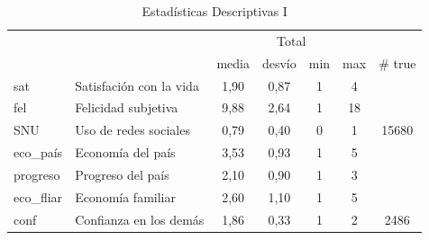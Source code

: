 \begin{table}[htbp]
  \centering
  \caption{Estadísticas Descriptivas I}
    \begin{tabular}{rlrrrrr}
          &       & \multicolumn{4}{c}{Total}     &  \\
          &       & \multicolumn{1}{c}{media} & \multicolumn{1}{c}{desvío} & \multicolumn{1}{c}{min} & \multicolumn{1}{c}{max} & \multicolumn{1}{c}{\# true} \\
    \midrule
    \multicolumn{1}{l}{sat} & Satisfación con la vida & \multicolumn{1}{c}{1,90} & \multicolumn{1}{c}{0,87} & \multicolumn{1}{c}{1} & \multicolumn{1}{c}{4} &  \\
    \multicolumn{1}{l}{fel} & Felicidad subjetiva & \multicolumn{1}{c}{9,88} & \multicolumn{1}{c}{2,64} & \multicolumn{1}{c}{1} & \multicolumn{1}{c}{18} &  \\
    \multicolumn{1}{l}{SNU} & Uso de redes sociales & \multicolumn{1}{c}{0,79} & \multicolumn{1}{c}{0,40} & \multicolumn{1}{c}{0} & \multicolumn{1}{c}{1} & \multicolumn{1}{c}{15680} \\
    \multicolumn{1}{l}{eco\_país} & Economía del país & \multicolumn{1}{c}{3,53} & \multicolumn{1}{c}{0,93} & \multicolumn{1}{c}{1} & \multicolumn{1}{c}{5} &  \\
    \multicolumn{1}{l}{progreso} & Progreso del país & \multicolumn{1}{c}{2,10} & \multicolumn{1}{c}{0,90} & \multicolumn{1}{c}{1} & \multicolumn{1}{c}{3} &  \\
    \multicolumn{1}{l}{eco\_fliar} & Economía familiar & \multicolumn{1}{c}{2,60} & \multicolumn{1}{c}{1,10} & \multicolumn{1}{c}{1} & \multicolumn{1}{c}{5} &  \\
    \multicolumn{1}{l}{conf} & Confianza en los demás & \multicolumn{1}{c}{1,86} & \multicolumn{1}{c}{0,33} & \multicolumn{1}{c}{1} & \multicolumn{1}{c}{2} & \multicolumn{1}{c}{2486} \\
    

\end{tabular}
\end{table}
